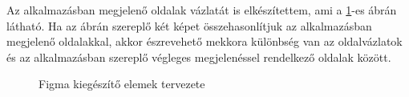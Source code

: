 Az alkalmazásban megjelenő oldalak vázlatát is elkészítettem, ami a \ref{fig.picture-12}-es ábrán látható. Ha az ábrán szereplő két képet összehasonlítjuk az alkalmazásban megjelenő oldalakkal, akkor észrevehető mekkora különbség van az oldalvázlatok és az alkalmazásban szereplő végleges megjelenéssel rendelkező oldalak között.
\begin{figure}[H]
	\centering
	\hspace{5pt}
	\caption{Figma kiegészítő elemek tervezete}
	\label{fig.picture-12}
\end{figure}

